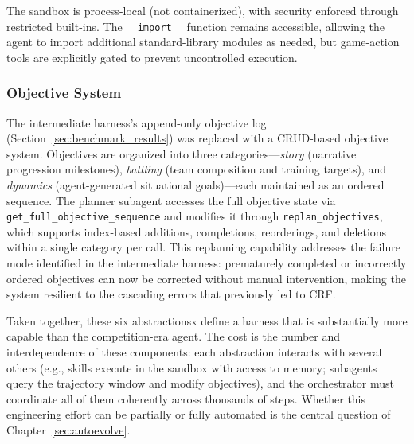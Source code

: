 The sandbox is process-local (not containerized), with security enforced through restricted built-ins. The \texttt{\_\_import\_\_} function remains accessible, allowing the agent to import additional standard-library modules as needed, but game-action tools are explicitly gated to prevent uncontrolled execution.

\subsubsection{Objective System}\label{sec:objective_system}

The intermediate harness's append-only objective log (Section~\ref{sec:benchmark_results}) was replaced with a CRUD-based objective system. Objectives are organized into three categories---\emph{story} (narrative progression milestones), \emph{battling} (team composition and training targets), and \emph{dynamics} (agent-generated situational goals)---each maintained as an ordered sequence. The planner subagent accesses the full objective state via \texttt{get\_full\_objective\_sequence} and modifies it through \texttt{replan\_objectives}, which supports index-based additions, completions, reorderings, and deletions within a single category per call. This replanning capability addresses the failure mode identified in the intermediate harness: prematurely completed or incorrectly ordered objectives can now be corrected without manual intervention, making the system resilient to the cascading errors that previously led to CRF.

\vspace{1em}
Taken together, these six abstractionsx define a harness that is substantially more capable than the competition-era agent. The cost is the number and interdependence of these components: each abstraction interacts with several others (e.g., skills execute in the sandbox with access to memory; subagents query the trajectory window and modify objectives), and the orchestrator must coordinate all of them coherently across thousands of steps. Whether this engineering effort can be partially or fully automated is the central question of Chapter~\ref{sec:autoevolve}.
